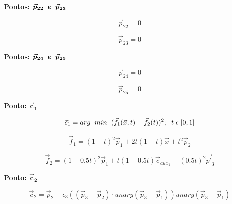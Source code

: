 \documentclass[10pt,a4paper]{report}
\begin{document}
\textbf{Pontos: {$\boldsymbol{\vec{p}_{22} \hspace{0.2cm} e \hspace{0.2cm} \vec{p}_{23}}$}}

\begin{equation}
\vec{p}_{22} = 0
\label{eq:p22}
\end{equation}

\begin{equation}
\vec{p}_{23} = 0
\label{eq:p23}
\end{equation}

\textbf{Pontos: {$\boldsymbol{\vec{p}_{24} \hspace{0.2cm} e \hspace{0.2cm} \vec{p}_{25}}$}}

\begin{equation}
\vec{p}_{24} = 0
\label{eq:p24}
\end{equation}

\begin{equation}
\vec{p}_{25} = 0
\label{eq:p25}
\end{equation}

\textbf{Ponto: {$\boldsymbol{\vec{c}_{1}}$}}

\begin{equation}
\vec{c}_{1} = arg \hspace{0.2cm} min \hspace{0.2cm} (\vec{f}_{1}(\vec{x}, t) - \vec{f}_{2}(t))^{2}; \hspace{0.2cm}  t \hspace{0.1cm}  \epsilon \hspace{0.1cm}  [0, 1]
\label{eq:c1}
\end{equation}

\begin{equation}
\vec{f}_{1} = (1 - t)^{2} \vec{p}_{1} + 2 t (1 - t) \vec{x} + t^{2} \vec{p}_{2}
\label{eq:f1}
\end{equation}

\begin{equation}
\vec{f}_{2} = (1 - 0.5 t)^{2} \vec{p}_{1} + t (1 - 0.5 t) \vec{c}_{aux_{1}} + (0.5 t)^{2} \vec{p'}_{3}
\label{eq:f2}
\end{equation}

\textbf{Ponto: {$\boldsymbol{\vec{c}_{2}}$}}

\begin{equation}
\vec{c}_{2} = \vec{p}_{2} + \epsilon_{3} ((\vec{p}_{3} - \vec{p}_{2}) \cdot unary(\vec{p}_{3} - \vec{p}_{1})) unary(\vec{p}_{3} - \vec{p}_{1})
\label{eq:c2}
\end{equation}
\end{document}

